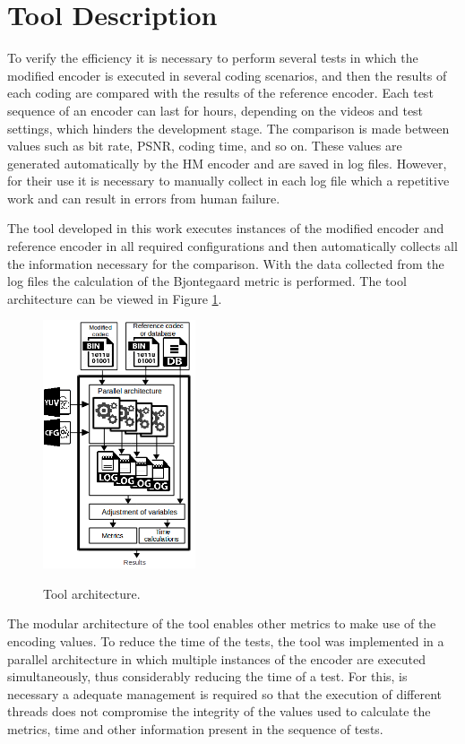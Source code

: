 \documentclass[journal]{IEEEtran}
\begin{document}
\section{Tool Description}

To verify the efficiency it is necessary to perform several tests in which the modified encoder is executed in several coding scenarios, and then the results of each coding are compared with the results of the reference encoder. Each test sequence of an encoder can last for hours, depending on the videos and test settings, which hinders the development stage. The comparison is made between values such as bit rate, PSNR, coding time, and so on. These values are generated automatically by the HM encoder and are saved in log files. However, for their use it is necessary to manually collect in each log file which a repetitive work and can result in errors from human failure. 

The tool developed in this work executes instances of the modified encoder and reference encoder in all required configurations and then automatically collects all the information necessary for the comparison. With the data collected from the log files the calculation of the Bjontegaard \cite{Bjontegaard} metric is performed. The tool architecture can be viewed in Figure \ref{fig:fluxo}. 


\FloatBarrier
\begin{figure}[!ht]
	\centering
	\caption{Tool architecture.}
	\includegraphics[width=0.4\textwidth]{figures/fluxo.png}
	\label{fig:fluxo}	
\end{figure}
\FloatBarrier

The modular architecture of the tool enables other metrics to make use of the encoding values. To reduce the time of the tests, the tool was implemented in a parallel architecture in which multiple instances of the encoder are executed simultaneously, thus considerably reducing the time of a test. For this, is necessary a adequate management is required so that the execution of different threads does not compromise the integrity of the values used to calculate the metrics, time and other information present in the sequence of tests.
\end{document}

